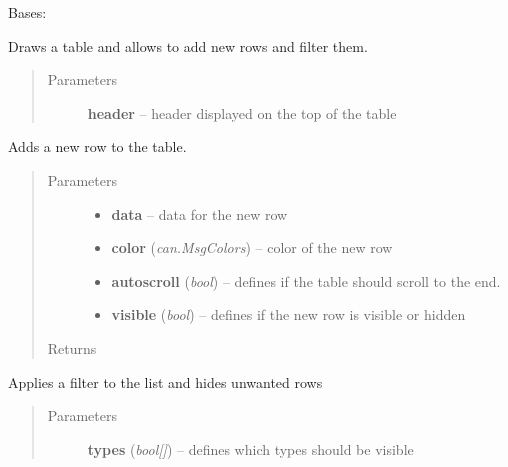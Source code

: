 \documentclass[letterpaper,10pt,english]{sphinxmanual}
\begin{document}
\begin{fulllineitems}
\label{gui:gui.communication.Table}
Bases: 

Draws a table and allows to add new rows and filter them.
\begin{quote}\begin{description}
\item[{Parameters}] \leavevmode
\textbf{header} -- header displayed on the top of the table

\end{description}\end{quote}

\begin{fulllineitems}
\label{gui:gui.communication.Table.add_row}
Adds a new row to the table.
\begin{quote}\begin{description}
\item[{Parameters}] \leavevmode\begin{itemize}
\item {} 
\textbf{data} -- data for the new row

\item {} 
\textbf{color} (\emph{can.MsgColors}) -- color of the new row

\item {} 
\textbf{autoscroll} (\emph{bool}) -- defines if the table should scroll to the end.

\item {} 
\textbf{visible} (\emph{bool}) -- defines if the new row is visible or hidden

\end{itemize}

\item[{Returns}] \leavevmode


\end{description}\end{quote}

\end{fulllineitems}


\begin{fulllineitems}
\label{gui:gui.communication.Table.filter_types}
Applies a filter to the list and hides unwanted rows
\begin{quote}\begin{description}
\item[{Parameters}] \leavevmode
\textbf{types} (\emph{bool{[}{]}}) -- defines which types should be visible


\end{description}
\end{quote}
\end{fulllineitems}
\end{fulllineitems}
\end{document}
